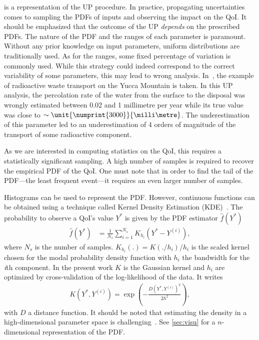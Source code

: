  is a representation of the UP procedure. In practice, propagating uncertainties comes to sampling the PDFs of inputs and observing the impact on the QoI. It should be emphasized that the outcome of the UP \emph{depends} on the prescribed PDFs. The nature of the PDF and the ranges of each parameter is paramount. Without any prior knowledge on input parameters, uniform distributions are traditionally used. As for the ranges, some fixed percentage of variation is commonly used. While this strategy could indeed correspond to the correct variability of some parameters, this may lead to wrong analysis. In~\citep{pilkey}, the example of radioactive waste transport on the Yucca Mountain is taken. In this UP analysis, the percolation rate of the water from the surface to the disposal was wrongly estimated between 0.02 and 1 millimetre per year while its true value was close to $\sim \unit{\numprint{3000}}{\milli\metre}$. The underestimation of this parameter led to an underestimation of 4 orders of magnitude of the transport of some radioactive component.

As we are interested in computing statistics on the QoI, this requires a statistically significant sampling. A high number of samples is required to recover the empirical PDF of the QoI. One must note that in order to find the tail of the PDF---the least frequent event---it requires an even larger number of samples.

Histograms can be used to represent the PDF. However, continuous functions can be obtained using a technique called Kernel Density Estimation (KDE)~\cite{Wand1995}. The probability to observe a QoI's value $Y^*$ is given by the PDF estimator $\hat{f}(Y^*)$
\begin{align}
\hat{f}(Y^*)&= \frac{1}{N_{s}}\sum_{i=1}^{N_{s}} K_{h_i}(Y^*-Y^{(i)}),
\end{align}
\noindent where $N_s$ is the number of samples. $K_{h_i}(.) = K(./h_i)/h_i$ is the scaled kernel chosen for the modal probability density function with $h_{i}$ the bandwidth for the \emph{i}th component. In the present work $K$ is the Gaussian kernel and $h_{i}$ are optimized by cross-validation of the log-likelihood of the data. It writes
\begin{align}
K\left(Y^*,Y^{(i)}\right) = \exp\left( - \frac{D\left(Y^*,Y^{(i)}\right)^2}{2h^2} \right), \label{eq:kde}
\end{align}
\noindent with $D$ a distance function. It should be noted that estimating the density in a high-dimensional parameter space is challenging~\citep{Scholkopf1999,Scott2015}. See \cref{sec:visu} for a $n$-dimensional representation of the PDF.

